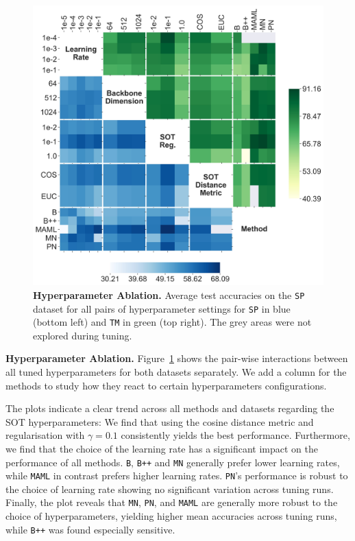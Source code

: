 \begin{figure}[h!]
    \centering
    \includegraphics[width=1\columnwidth]{figures/hparams-interaction-combined.png}
    \caption{\textbf{Hyperparameter Ablation.} Average test accuracies on the \texttt{SP} dataset for all pairs of hyperparameter settings for \texttt{SP} in blue (bottom left) and \texttt{TM} in green (top right). The grey areas were not explored during tuning.}
    \label{fig:hparams-swissprot-grid}
\end{figure}

\textbf{Hyperparameter Ablation.} Figure~\ref{fig:hparams-swissprot-grid} shows the pair-wise interactions between all tuned hyperparameters for both datasets separately. We add a column for the methods to study how they react to certain hyperparameters configurations. 

The plots indicate a clear trend across all methods and datasets regarding the SOT hyperparameters: We find that using the cosine distance metric and regularisation with $\gamma = 0.1$ consistently yields the best performance. 
Furthermore, we find that the choice of the learning rate has a significant impact on the performance of all methods. \texttt{B}, \texttt{B++} and \texttt{MN} generally prefer lower learning rates, while \texttt{MAML} in contrast prefers higher learning rates. \texttt{PN}'s performance is robust to the choice of learning rate showing no significant variation across tuning runs.
Finally, the plot reveals that \texttt{MN}, \texttt{PN}, and \texttt{MAML} are generally more robust to the choice of hyperparameters, yielding higher mean accuracies across tuning runs, while  \texttt{B++} was found especially sensitive. 



